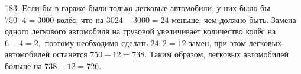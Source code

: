 183. Если бы в гараже были только легковые автомобили, у них было бы $750\cdot4=3000$ колёс, что на $3024-3000=24$ меньше, чем должно быть. Замена одного легкового автомобиля на грузовой увеличивает количество колёс на $6-4=2,$ поэтому необходимо сделать $24:2=12$ замен, при этом легковых автомобилей останется $750-12=738.$ Таким образом, легковых автомобилей больше на $738-12=726.$\\
